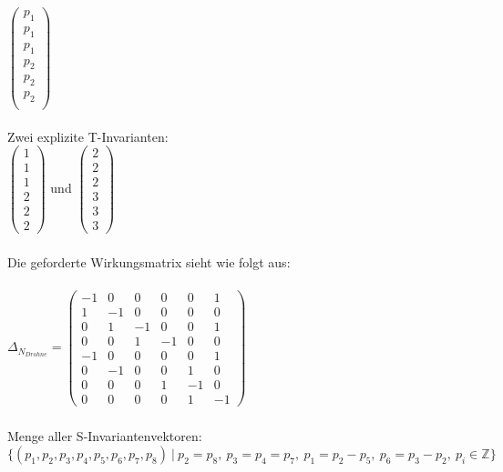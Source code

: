 \documentclass[a4paper,12pt]{scrartcl}
\begin{document}
$
\begin{pmatrix}
p_1\\
p_1\\
p_1\\
p_2\\
p_2\\
p_2\\
\end{pmatrix}
$\\\\
Zwei explizite T-Invarianten:\\
$
\begin{pmatrix}
1\\
1\\
1\\
2\\
2\\
2
\end{pmatrix}
$
und
$
\begin{pmatrix}
2\\
2\\
2\\
3\\
3\\
3
\end{pmatrix}
$
\subsubsection{}
Die geforderte Wirkungsmatrix sieht wie folgt aus:\\\\
$
\Delta_{N_{Drohne}} = 
\begin{pmatrix}
-1 & 0 & 0 & 0 & 0 & 1\\
1 & -1 & 0 & 0 & 0 & 0\\
0 & 1 & -1 & 0 & 0 & 1\\
0 & 0 & 1 & -1 & 0 & 0\\
-1 & 0 & 0 & 0 & 0 & 1\\
0 & -1 & 0 & 0 & 1 & 0\\
0 & 0 & 0 & 1 & -1 & 0\\
0 & 0 & 0 & 0 & 1 & -1
\end{pmatrix}
$
\subsubsection{}
Menge aller S-Invariantenvektoren:\\
$\{(p_1,p_2,p_3,p_4,p_5,p_6,p_7,p_8)\ |\ p_2=p_8,\ p_3=p_4=p_7,\ p_1=p_2-p_5,\ p_6=p_3-p_2,\ p_i \in \mathbb{Z}\}$
\subsubsection{}
\end{document}
